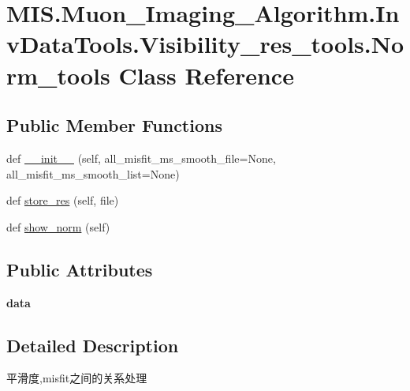 \hypertarget{classMIS_1_1Muon__Imaging__Algorithm_1_1InvDataTools_1_1Visibility__res__tools_1_1Norm__tools}{}\section{M\+I\+S.\+Muon\+\_\+\+Imaging\+\_\+\+Algorithm.\+Inv\+Data\+Tools.\+Visibility\+\_\+res\+\_\+tools.\+Norm\+\_\+tools Class Reference}
\label{classMIS_1_1Muon__Imaging__Algorithm_1_1InvDataTools_1_1Visibility__res__tools_1_1Norm__tools}
\subsection*{Public Member Functions}
\begin{DoxyCompactItemize}
\item 
def \hyperlink{classMIS_1_1Muon__Imaging__Algorithm_1_1InvDataTools_1_1Visibility__res__tools_1_1Norm__tools_a21a911a30a28262f6a2b7e800287cfb8}{\+\_\+\+\_\+init\+\_\+\+\_\+} (self, all\+\_\+misfit\+\_\+ms\+\_\+smooth\+\_\+file=None, all\+\_\+misfit\+\_\+ms\+\_\+smooth\+\_\+list=None)
\item 
def \hyperlink{classMIS_1_1Muon__Imaging__Algorithm_1_1InvDataTools_1_1Visibility__res__tools_1_1Norm__tools_ad28891be9bc7fb1f9175bf16330edfaa}{store\+\_\+res} (self, file)
\item 
def \hyperlink{classMIS_1_1Muon__Imaging__Algorithm_1_1InvDataTools_1_1Visibility__res__tools_1_1Norm__tools_aeea34c391a05bea5a5ff6162a038c679}{show\+\_\+norm} (self)
\end{DoxyCompactItemize}
\subsection*{Public Attributes}
\begin{DoxyCompactItemize}
\item 
\mbox{\label{classMIS_1_1Muon__Imaging__Algorithm_1_1InvDataTools_1_1Visibility__res__tools_1_1Norm__tools_a4011ed826fe846121eb8c7308a5d7c18}} 
{\bfseries data}
\end{DoxyCompactItemize}


\subsection{Detailed Description}
\begin{DoxyVerb}平滑度,misfit之间的关系处理
\end{DoxyVerb}
 

